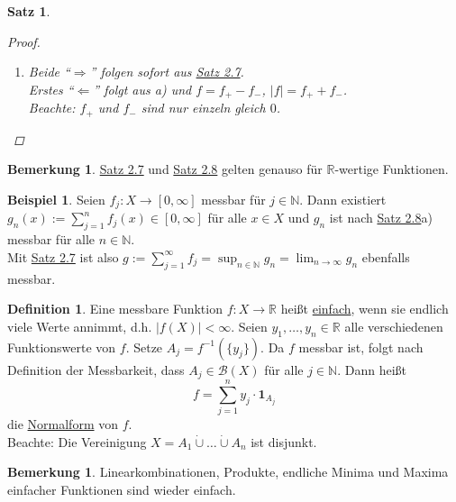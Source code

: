 \documentclass[a4paper]{report}
\newcommand{\doubleOne}{\textbf{1}}
\newcommand{\R}{\mathbb{R}}
\newcommand{\N}{\mathbb{N}}
\newcommand{\Borel}{\mathcal{B}}
\newcommand{\toInf}{\rightarrow \infty}
\newcommand{\limToInf}[1]{\lim_{#1 \toInf}}
\newcommand{\dcup}{\dot{\cup}}
\newcommand{\jlabel}[1]{\label{j_#1}}
\newcommand{\jhyperref}[2]{\hyperref[j_#1]{#2}}
\newcommand{\jlink}[1]{\jhyperref{#1}{#1}}
\newcommand{\jabb}[3]{ #1: #2 \rightarrow #3 }
\theoremstyle{plain}
\newtheorem{satz}[thm]{Satz}
\theoremstyle{definition}
\newtheorem{defn}[thm]{Definition}
\newtheorem{bem}[thm]{Bemerkung}
\newtheorem*{expl*}{Beispiel}
\newtheorem*{bem*}{Bemerkung}
\begin{document}
{{{\begin{satz}
\begin{proof}
\begin{enumerate}
                Mit \jlink{Satz 2.7} folgt dann, dass $\alpha\cdot f + \beta\cdot g$ messbar ist.\\
                (Ähnlicher Beweis für $f\cdot g$. Beachte dabei: Falls $f(x)=0,g(x)=\infty$ folgt: $f_n(x)\cdot g_n(x) = 0\cdot n = 0 \xrightarrow{n\rightarrow \infty} 0 = f(x)\cdot g(x)$.)
            \item
                Beide ``$\Rightarrow$'' folgen sofort aus \jlink{Satz 2.7}.\\
                Erstes ``$\Leftarrow$'' folgt aus a) und $f=f_+-f_-$, $|f| = f_++f_-$.\\
                Beachte: $f_+$ und $f_-$ sind nur einzeln gleich $0$.
        \end{enumerate}
    \end{proof}
\end{satz}

\begin{bem*}
    \jlink{Satz 2.7} und \jlink{Satz 2.8} gelten genauso für $\R$-wertige Funktionen.
\end{bem*}

\begin{expl*}
    Seien $\jabb{f_j}{X}{[0,\infty]}$ messbar für $j\in\N$. Dann existiert $g_n(x):= \sum_{j=1}^n f_j(x) \in [0,\infty]$ für alle $x\in X$ und $g_n$ ist nach \jlink{Satz 2.8}a) messbar für alle $n\in\N$.\\
    Mit \jlink{Satz 2.7} ist also $g := \sum_{j=1}^\infty f_j= \sup_{n\in\N}g_n = \limToInf{n} g_n$ ebenfalls messbar.
\end{expl*}

\begin{defn}
\jlabel{Def 2.9}
    Eine messbare Funktion $\jabb{f}{X}{\R}$ heißt \uline{einfach}, wenn sie endlich viele Werte annimmt, d.h. $|f(X)| < \infty$. Seien $y_1,\dots,y_n \in \R$ alle verschiedenen Funktionswerte von $f$. Setze $A_j = f^{-1}(\{y_j\})$. Da $f$ messbar ist, folgt nach Definition der Messbarkeit, dass $A_j\in\Borel(X)$ für alle $j\in\N$. Dann heißt
    \begin{displaymath}
        f = \sum_{j=1}^n y_j \cdot \doubleOne_{A_j}
    \end{displaymath}
    die \uline{Normalform} von $f$.\\
    Beachte: Die Vereinigung $X = A_1 \dcup \dots \dcup A_n$ ist disjunkt. 
\end{defn}

\begin{bem}
\jlabel{Bem 2.10}
    Linearkombinationen, Produkte, endliche Minima und Maxima einfacher Funktionen sind wieder einfach.
\end{bem}

}}}
\end{document}
